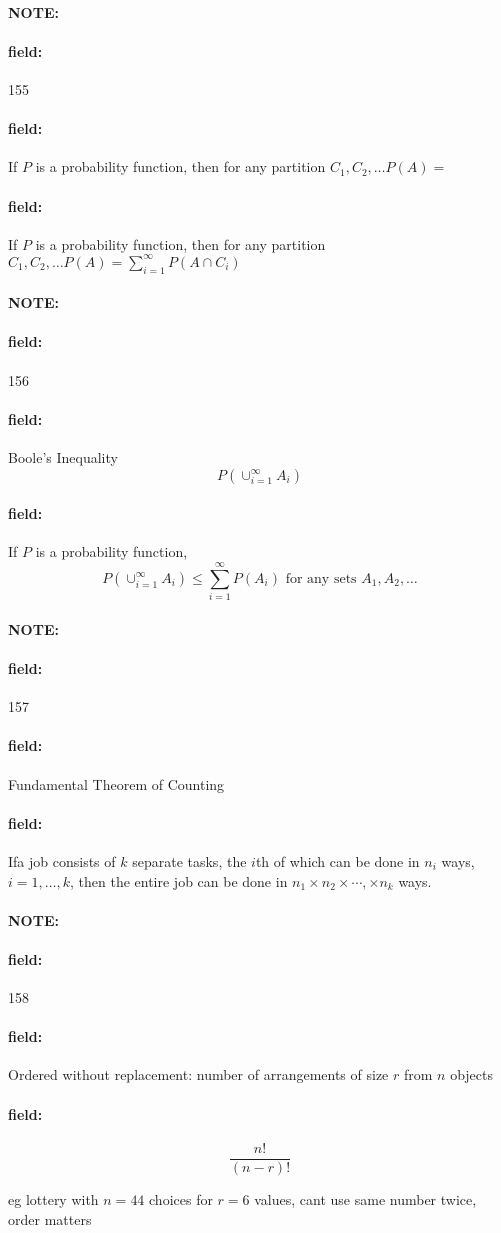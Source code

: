 \documentclass[12pt]{article}
\newenvironment{note}{\paragraph{NOTE:}}{}
\newenvironment{field}{\paragraph{field:}}{}
\begin{document}
\begin{note} \begin{field} \tiny 155 \end{field}
    \begin{field}
        If $P$ is a probability function, then for any partition $C_1, C_2, \ldots P(A) = $
    \end{field}
    \begin{field}
        If $P$ is a probability function, then for any partition $C_1, C_2, \ldots P(A) = \sum_{i=1}^\infty P(A \cap C_i)$
    \end{field}
\end{note}

\begin{note} \begin{field} \tiny 156 \end{field}
    \begin{field}
        Boole's Inequality
        $$P(\cup_{i=1}^\infty A_i)$$
    \end{field}
    \begin{field}
        If $P$ is a probability function,
            $$P(\cup_{i=1}^\infty A_i) \leq \sum_{i=1}^\infty P(A_i) \text{ for any sets } A_1, A_2, \ldots $$
    \end{field}
\end{note}

\begin{note} \begin{field} \tiny 157 \end{field}
    \begin{field}
        Fundamental Theorem of Counting
    \end{field}
    \begin{field}
        Ifa job consists of $k$ separate tasks, the $i$th of which can be done in $n_i$ ways, $i = 1, \ldots, k$, then the entire job can be done in $n_1 \times n_2 \times \cdots, \times n_k$ ways.
    \end{field}
\end{note}

\begin{note} \begin{field} \tiny 158 \end{field}
    \begin{field}
        Ordered without replacement: number of arrangements of size $r$ from $n$ objects
    \end{field}
    \begin{field}
        $$\frac{n!}{(n-r)!}$$

        eg lottery with $n=44$ choices for $r=6$ values, cant use same number twice, order matters
    \end{field}
\end{note}
\end{document}
